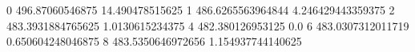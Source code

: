 0 496.87060546875 14.490478515625
1 486.6265563964844 4.246429443359375
2 483.3931884765625 1.0130615234375
4 482.380126953125 0.0
6 483.0307312011719 0.650604248046875
8 483.5350646972656 1.154937744140625
